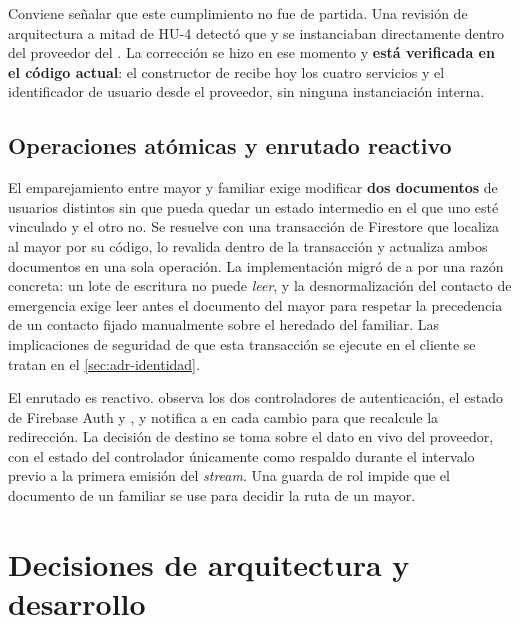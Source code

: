 Conviene señalar que este cumplimiento no fue de partida. Una revisión de arquitectura a mitad de HU-4
detectó que  y  se instanciaban directamente dentro del proveedor
del . La corrección se hizo en ese momento y \textbf{está verificada en el código
actual}: el constructor de  recibe hoy los cuatro servicios y el identificador de
usuario desde el proveedor, sin ninguna instanciación interna.

\subsection{Operaciones atómicas y enrutado reactivo}

El emparejamiento entre mayor y familiar exige modificar \textbf{dos documentos} de usuarios distintos sin
que pueda quedar un estado intermedio en el que uno esté vinculado y el otro no. Se resuelve con una
transacción de Firestore que localiza al mayor por su código, lo revalida dentro de la transacción y
actualiza ambos documentos en una sola operación. La implementación migró de  a
 por una razón concreta: un lote de escritura no puede \emph{leer}, y la
desnormalización del contacto de emergencia exige leer antes el documento del mayor para respetar la
precedencia de un contacto fijado manualmente sobre el heredado del familiar. Las implicaciones de
seguridad de que esta transacción se ejecute en el cliente se tratan en el \autoref{sec:adr-identidad}.

El enrutado es reactivo.  observa los dos controladores de autenticación, el estado de
Firebase Auth y , y notifica a  en cada cambio para que
recalcule la redirección. La decisión de destino se toma sobre el dato en vivo del proveedor, con el estado
del controlador únicamente como respaldo durante el intervalo previo a la primera emisión del \emph{stream}.
Una guarda de rol impide que el documento de un familiar se use para decidir la ruta de un mayor.

\section{Decisiones de arquitectura y desarrollo}
\label{sec:adr}

